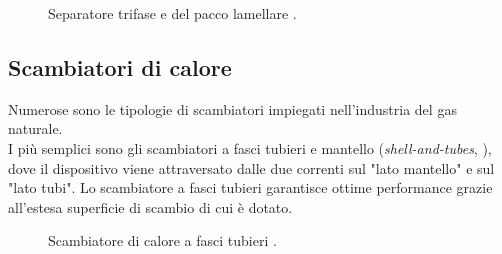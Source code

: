 \begin{figure}[htbp]
    \centering
     \qquad
\caption{Separatore trifase e del pacco lamellare \parencite{bianco2005impiantiolio}.}
\label{fig:trifase}
\end{figure}

\subsection{Scambiatori di calore}
Numerose sono le tipologie di scambiatori impiegati nell'industria del gas naturale. \\
I più semplici sono gli scambiatori a fasci tubieri e mantello (\textit{shell-and-tubes}, ), dove il dispositivo viene attraversato dalle due correnti sul "lato mantello" e sul "lato tubi". Lo scambiatore a fasci tubieri garantisce ottime performance grazie all'estesa superficie di scambio di cui è dotato.

\begin{figure}[htbp]
    \centering
     \qquad
\caption{Scambiatore di calore a fasci tubieri \parencite{guadagni2003prontuario}.}
\label{fig:tubieri}
\end{figure}

